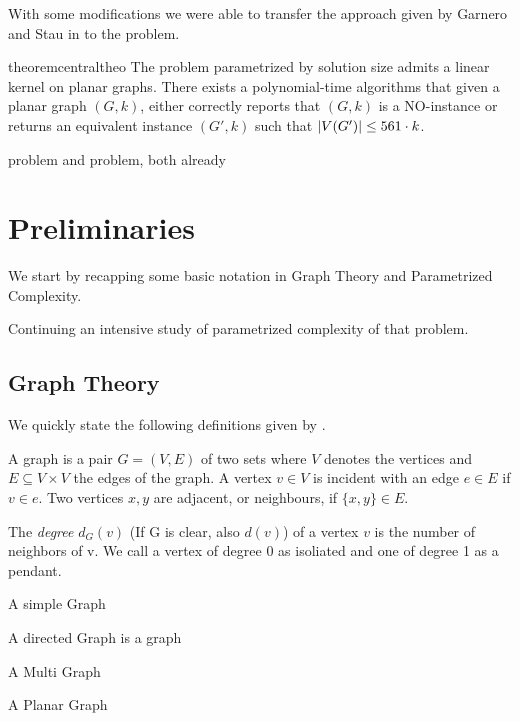 With some  modifications we were able to transfer the approach given by Garnero and Stau in \cite{Garnero2018} to the \sdom problem.

\begin{restatable}[]{theorem}{centraltheo}\label{thm:central}
    The \sdom problem parametrized by solution size admits a linear kernel on planar graphs. There exists a polynomial-time algorithms that given a planar graph $(G, k)$, either correctly reports that $(G, k)$ is a NO-instance or returns an equivalent instance $(G', k)$ such that $\abs{V(G')} \leq 561 \cdot k$.
\end{restatable}

\dom problem and \tdom problem, both already 

\chapter{Preliminaries}
We start by recapping some basic notation in Graph Theory and Parametrized Complexity. 

Continuing an intensive study of parametrized complexity of that problem. 

\section{Graph Theory}
We quickly state the following definitions given by {\cite[p.~xxx]{diestel10}}.

\begin{definition}
    A graph is a pair $G = (V, E)$ of two sets where $V$ denotes the vertices and $E \subseteq V \times V$ the edges of the graph.  A vertex $v \in V$ is incident with an edge $e \in E$ if $v \in e$. Two vertices $x, y$ are adjacent, or neighbours, if $\{x,y \} \in E$.
\end{definition}

\begin{definition}
    The \textit{degree} $d_G(v)$ (If G is clear, also $d(v)$) of a vertex $v$ is the number of neighbors of v. We call a vertex of degree 0 as isoliated and one of degree 1 as a pendant.
\end{definition}


\begin{definition}
    A simple Graph
    
    A directed Graph is a graph
    
    A Multi Graph
    
    A Planar Graph
\end{definition}

